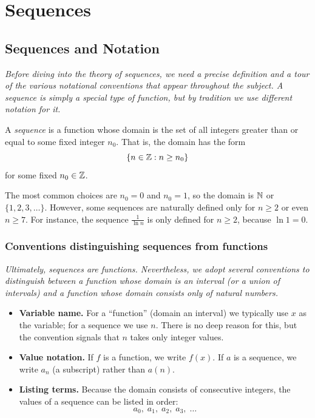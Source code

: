 \chapter{Sequences}

\section{Sequences and Notation}
\label{sec:11.1}

\textit{Before diving into the theory of sequences, we need a precise definition and a tour of the various notational conventions that appear throughout the subject.  A sequence is simply a special type of function, but by tradition we use different notation for it.}

\begin{definition}[Sequence]
\label{def:11-1}
A \emph{sequence} is a function whose domain is the set of all integers greater than or equal to some fixed integer $n_{0}$.  That is, the domain has the form
\[
  \{n \in \mathbb{Z} : n \ge n_{0}\}
\]
for some fixed $n_{0}\in\mathbb{Z}$.
\end{definition}

\begin{remark}
The most common choices are $n_{0}=0$ and $n_{0}=1$, so the domain is $\mathbb{N}$ or $\{1,2,3,\dots\}$.  However, some sequences are naturally defined only for $n\ge 2$ or even $n\ge 7$.  For instance, the sequence $\frac{1}{\ln n}$ is only defined for $n\ge 2$, because $\ln 1 = 0$.
\end{remark}

\subsection*{Conventions distinguishing sequences from functions}

\textit{Ultimately, sequences are functions.  Nevertheless, we adopt several conventions to distinguish between a function whose domain is an interval (or a union of intervals) and a function whose domain consists only of natural numbers.}

\begin{itemize}
  \item \textbf{Variable name.}  For a ``function'' (domain an interval) we typically use $x$ as the variable; for a sequence we use $n$.  There is no deep reason for this, but the convention signals that $n$ takes only integer values.

  \item \textbf{Value notation.}  If $f$ is a function, we write $f(x)$.  If $a$ is a sequence, we write $a_{n}$ (a subscript) rather than $a(n)$.

  \item \textbf{Listing terms.}  Because the domain consists of consecutive integers, the values of a sequence can be listed in order:
  \[
    a_{0},\; a_{1},\; a_{2},\; a_{3},\; \dots
  \]
\end{itemize}

